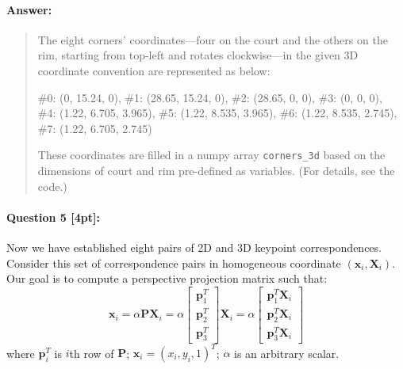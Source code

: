 \documentclass[11pt]{article}
\begin{document}
\paragraph{Answer:} 
\begin{quote}
    The eight corners' coordinates---four on the court and the others on the rim, starting from top-left and rotates clockwise---in the given 3D coordinate convention are represented as below:

    \#0: (0, 15.24, 0), \#1: (28.65, 15.24, 0), \#2: (28.65, 0, 0), \#3: (0, 0, 0), \\
    \#4: (1.22, 6.705, 3.965), \#5: (1.22, 8.535, 3.965), \#6: (1.22, 8.535, 2.745), \#7: (1.22, 6.705, 2.745)

    These coordinates are filled in a numpy array \verb|corners_3d| based on the dimensions of court and rim pre-defined as variables. (For details, see the code.)
\end{quote}


\paragraph{Question 5 [4pt]:} 
Now we have established eight pairs of 2D and 3D keypoint correspondences. 
Consider this set of correspondence pairs in homogeneous coordinate $(\mathbf{x}_i, \mathbf{X}_i)$. Our goal is to compute a perspective projection matrix such that: 
\[
\mathbf{x}_i = \alpha \mathbf{P} \mathbf{X}_i = 
\alpha \left[
\begin{array}{c}
\mathbf{p}_1^T \\
\mathbf{p}_2^T \\
\mathbf{p}_3^T
\end{array}
\right]
\mathbf{X}_i
= 
\alpha \left[
\begin{array}{c}
\mathbf{p}_1^T\mathbf{X}_i \\
\mathbf{p}_2^T\mathbf{X}_i \\
\mathbf{p}_3^T\mathbf{X}_i
\end{array}
\right]
\]
where $\mathbf{p}_i^T$ is $i$th row of $\mathbf{P}$; $\mathbf{x}_i = (x_i, y_i, 1)^T$; $\alpha$ is an arbitrary scalar. 
\end{document}
